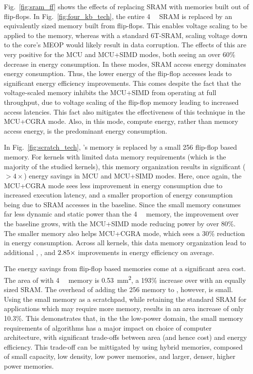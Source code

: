 Fig.~\ref{fig:sram_ff} shows the effects of replacing SRAM with 
memories built out of flip-flops.
In Fig.~\ref{fig:four_kb_tech}, the entire \SI{4}{\kibi\byte} SRAM is replaced
by an equivalently sized memory built from flip-flops.  This enables voltage
scaling to be applied to the memory, whereas with a standard 6T-SRAM, scaling
voltage down to the core's MEOP would likely result in data corruption. The
effects of this are very positive for the MCU and MCU+SIMD modes, both
seeing an over 60\% decrease in energy consumption. In
these modes, SRAM access energy dominates energy consumption.  Thus, the lower
energy of the flip-flop accesses leads to significant energy efficiency
improvements.  This comes despite the fact that the voltage-scaled memory
inhibits the MCU+SIMD from operating at full throughput, due to voltage scaling
of the flip-flop memory leading to increased access latencies. This fact also
mitigates the effectiveness of this technique in the MCU+CGRA mode.
Also, in this mode, compute energy, rather than memory access energy, is the
predominant energy consumption.

In Fig.~\ref{fig:scratch_tech}, \arch{}'s memory is replaced by a small
\SI{256}{\byte} flip-flop based memory.  For kernels with limited data memory
requirements (which is the majority of the studied kernels), this memory
organization results in significant (\(> 4\times\)) energy savings in MCU
and MCU+SIMD modes.  Here, once again, the MCU+CGRA mode sees
less improvement in energy consumption due to increased execution latency, and a
smaller proportion of energy consumption being due to SRAM accesses in
the baseline.  Since the small memory consumes far less dynamic and static
power than the \SI{4}{\kibi\byte} memory, the improvement over the baseline
grows, with the MCU+SIMD mode reducing power by over 80\%.
The smaller memory also helps MCU+CGRA mode, which sees a 30\% reduction
in energy consumption.
Across all kernels, this data memory
organization lead to additional \FFImprovementMcu{}, \FFImprovementVMAcc{}, and
\(2.85{}\times\) improvements in energy efficiency on average.

The energy savings from flip-flop based memories come at a significant area
cost. The area of \arch{} with \SI{4}{\kibi\byte} memory is
\SI{0.53}{\milli\meter\squared}, a 193\% increase over \arch{} with an equally
sized SRAM.
The overhead of adding the \SI{256}{\byte} memory to \arch{}, however, is small.
Using the small memory as a scratchpad, while retaining the standard SRAM
for applications which may require more memory, results in an area increase
of only 10.3\%.
This demonstrates that, in the the low-power \olfc{} domain, the small memory
requirements of algorithms has a major impact on choice of computer
architecture, with significant trade-offs between area (and hence cost)
and energy efficiency.  This trade-off can be mittigated by using hybrid
memories, composed of small capacity, low density, low power memories, and
larger, denser, higher power memories.


